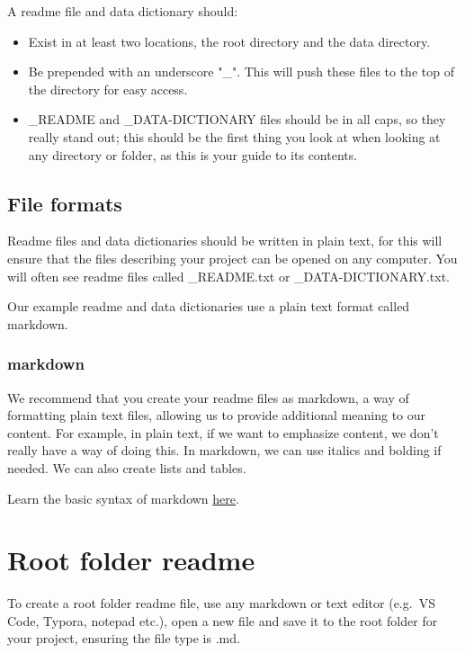 \documentclass[
]{book}
\providecommand{\tightlist}{%
  \setlength{\itemsep}{0pt}\setlength{\parskip}{0pt}}
\begin{document}
A readme file and data dictionary should:

\begin{itemize}
\tightlist
\item
  Exist in at least two locations, the root directory and the data directory.
\item
  Be prepended with an underscore "\_". This will push these files to the top of the directory for easy access.
\item
  \_README and \_DATA-DICTIONARY files should be in all caps, so they really stand out; this should be the first thing you look at when looking at any directory or folder, as this is your guide to its contents.
\end{itemize}

\subsection*{File formats}\label{file-formats}

Readme files and data dictionaries should be written in plain text, for this will ensure that the files describing your project can be opened on any computer. You will often see readme files called \_README.txt or \_DATA-DICTIONARY.txt.

Our example readme and data dictionaries use a plain text format called markdown.

\subsubsection*{markdown}\label{markdown}

We recommend that you create your readme files as markdown, a way of formatting plain text files, allowing us to provide additional meaning to our content. For example, in plain text, if we want to emphasize content, we don't really have a way of doing this. In markdown, we can use italics and bolding if needed. We can also create lists and tables.

Learn the basic syntax of markdown \href{https://ubco-biology.github.io/Procedures-and-Guidelines/markdown-1.html}{here}.

\section{Root folder readme}\label{root-folder-readme}

To create a root folder readme file, use any markdown or text editor (e.g.~VS Code, Typora, notepad etc.), open a new file and save it to the root folder for your project, ensuring the file type is .md.
\end{document}
